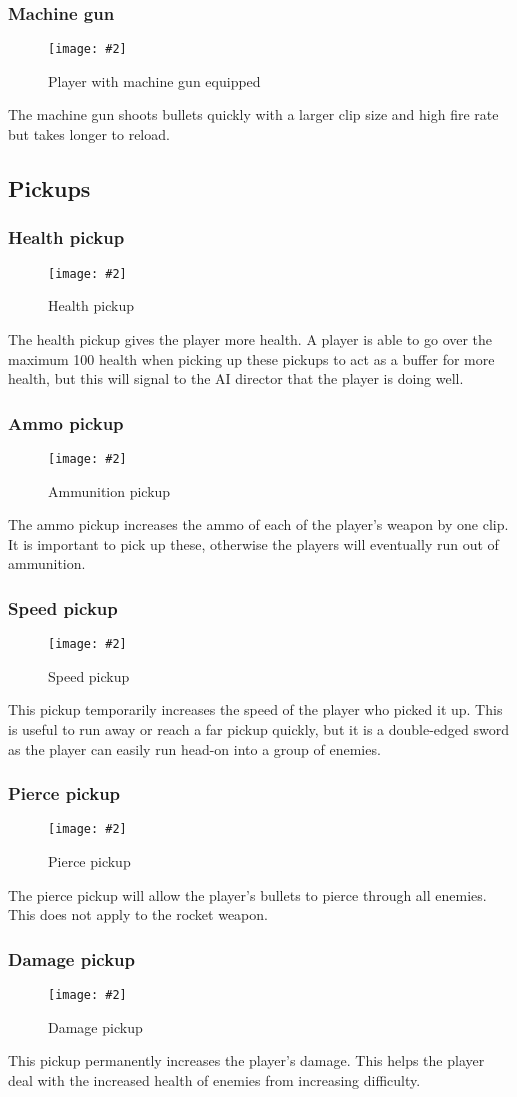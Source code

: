 \documentclass{article}
\newcommand{\figimg}[3]{
  \begin{figure}[H]
    \centering
    \texttt{[image: \#2]}
    \caption{#3}
  \end{figure}
  \noindent 
}
\begin{document}
\subsubsection{Machine gun}
\figimg{0.1}{imgs/MachineGun.png}{Player with machine gun equipped}
The machine gun shoots bullets quickly with a larger clip size and high fire rate but takes longer to reload.


\subsection{Pickups}
\subsubsection{Health pickup}
\figimg{0.1}{imgs/HealthPickup.png}{Health pickup}
The health pickup gives the player more health. A player is able to go over the maximum 100 health when picking up these pickups to act as a buffer for more health, but this will signal to the AI director that the player is doing well.

\subsubsection{Ammo pickup}
\figimg{0.1}{imgs/AmmoPickup.png}{Ammunition pickup}
The ammo pickup increases the ammo of each of the player's weapon by one clip. It is important to pick up these, otherwise the players will eventually run out of ammunition.

\subsubsection{Speed pickup}
\figimg{0.1}{imgs/SpeedPickup.png}{Speed pickup}
This pickup temporarily increases the speed of the player who picked it up. This is useful to run away or reach a far pickup quickly, but it is a double-edged sword as the player can easily run head-on into a group of enemies.

\subsubsection{Pierce pickup}
\figimg{0.1}{imgs/PiercePickup.png}{Pierce pickup}
The pierce pickup will allow the player's bullets to pierce through all enemies. This does not apply to the rocket weapon.

\subsubsection{Damage pickup}
\figimg{0.1}{imgs/DamagePickup.png}{Damage pickup}
This pickup permanently increases the player's damage. This helps the player deal with the increased health of enemies from increasing difficulty.
\end{document}
